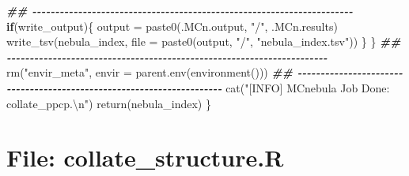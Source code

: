 \documentclass[
]{article}
\newenvironment{Shaded}{\begin{snugshade}}{\end{snugshade}}
\newcommand{\AttributeTok}[1]{\textcolor[rgb]{0.77,0.63,0.00}{#1}}
\newcommand{\ControlFlowTok}[1]{\textcolor[rgb]{0.13,0.29,0.53}{\textbf{#1}}}
\newcommand{\DocumentationTok}[1]{\textcolor[rgb]{0.56,0.35,0.01}{\textbf{\textit{#1}}}}
\newcommand{\FunctionTok}[1]{\textcolor[rgb]{0.00,0.00,0.00}{#1}}
\newcommand{\NormalTok}[1]{#1}
\newcommand{\OtherTok}[1]{\textcolor[rgb]{0.56,0.35,0.01}{#1}}
\newcommand{\SpecialCharTok}[1]{\textcolor[rgb]{0.00,0.00,0.00}{#1}}
\newcommand{\StringTok}[1]{\textcolor[rgb]{0.31,0.60,0.02}{#1}}
\begin{document}
\begin{Shaded}
\begin{Highlighting}[]
    \DocumentationTok{\#\# {-}{-}{-}{-}{-}{-}{-}{-}{-}{-}{-}{-}{-}{-}{-}{-}{-}{-}{-}{-}{-}{-}{-}{-}{-}{-}{-}{-}{-}{-}{-}{-}{-}{-}{-}{-}{-}{-}{-}{-}{-}{-}{-}{-}{-}{-}{-}{-}{-}{-}{-}{-}{-}{-}{-}{-}{-}{-}{-}{-}{-}{-}{-}{-}{-}{-}{-}{-}{-}{-} }
      \ControlFlowTok{if}\NormalTok{(write\_output)\{}
\NormalTok{        output }\OtherTok{=} \FunctionTok{paste0}\NormalTok{(.MCn.output, }\StringTok{"/"}\NormalTok{, .MCn.results)}
        \FunctionTok{write\_tsv}\NormalTok{(nebula\_index, }\AttributeTok{file =} \FunctionTok{paste0}\NormalTok{(output, }\StringTok{"/"}\NormalTok{, }\StringTok{"nebula\_index.tsv"}\NormalTok{))}
\NormalTok{      \}}
\NormalTok{    \}}
    \DocumentationTok{\#\# {-}{-}{-}{-}{-}{-}{-}{-}{-}{-}{-}{-}{-}{-}{-}{-}{-}{-}{-}{-}{-}{-}{-}{-}{-}{-}{-}{-}{-}{-}{-}{-}{-}{-}{-}{-}{-}{-}{-}{-}{-}{-}{-}{-}{-}{-}{-}{-}{-}{-}{-}{-}{-}{-}{-}{-}{-}{-}{-}{-}{-}{-}{-}{-}{-}{-}{-}{-}{-}{-} }
    \FunctionTok{rm}\NormalTok{(}\StringTok{"envir\_meta"}\NormalTok{, }\AttributeTok{envir =} \FunctionTok{parent.env}\NormalTok{(}\FunctionTok{environment}\NormalTok{()))}
    \DocumentationTok{\#\# {-}{-}{-}{-}{-}{-}{-}{-}{-}{-}{-}{-}{-}{-}{-}{-}{-}{-}{-}{-}{-}{-}{-}{-}{-}{-}{-}{-}{-}{-}{-}{-}{-}{-}{-}{-}{-}{-}{-}{-}{-}{-}{-}{-}{-}{-}{-}{-}{-}{-}{-}{-}{-}{-}{-}{-}{-}{-}{-}{-}{-}{-}{-}{-}{-}{-}{-}{-}{-}{-} }
    \FunctionTok{cat}\NormalTok{(}\StringTok{"[INFO] MCnebula Job Done: collate\_ppcp.}\SpecialCharTok{\textbackslash{}n}\StringTok{"}\NormalTok{)}
    \FunctionTok{return}\NormalTok{(nebula\_index)}
\NormalTok{  \}}
\end{Highlighting}
\end{Shaded}

\hypertarget{file-collate_structure.r}{%
\section{File: collate\_structure.R}\label{file-collate_structure.r}}
\end{document}
